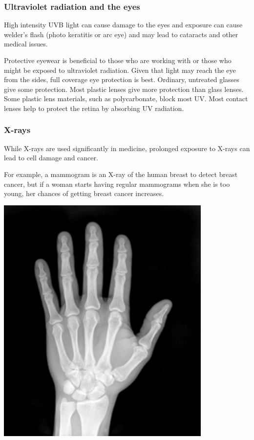             \subsubsection*{Ultraviolet radiation and the eyes}
            \nopagebreak
        \label{m38779*id189581}High intensity UVB light can cause damage to the eyes and exposure can cause welder's flash (photo keratitis or arc eye) and may lead to cataracts and other medical issues.\par 
        \label{m38779*id189586}Protective eyewear is beneficial to those who are working with or those who might be exposed to ultraviolet radiation. Given that light may reach the eye from the sides, full coverage eye protection is best.
        \label{m38779*id189594}Ordinary, untreated glasses give some protection. Most plastic lenses give more protection than glass lenses. Some plastic lens materials, such as polycarbonate, block most UV. Most contact lenses help to protect the retina by absorbing UV radiation.\par 
      \label{m38779*uid22}
\begin{minipage}{.5\textwidth}
            \subsubsection*{X-rays}
            \nopagebreak
        \label{m38779*id189613}While X-rays are used significantly in medicine, prolonged exposure to X-rays can lead to cell damage and cancer.\par 
        \label{m38779*id189617}For example, a mammogram is an X-ray of the human breast to detect breast cancer, but if a woman starts having regular mammograms when she is too young, her chances of getting breast cancer increases.\\
      \label{m38779*uid23}
\end{minipage}
\begin{minipage}{.5\textwidth}\begin{center}
 \includegraphics[width=0.8\textwidth]{photos/x-ray-hand_TraceMeek_flickr.jpg}\end{center}
\end{minipage}
